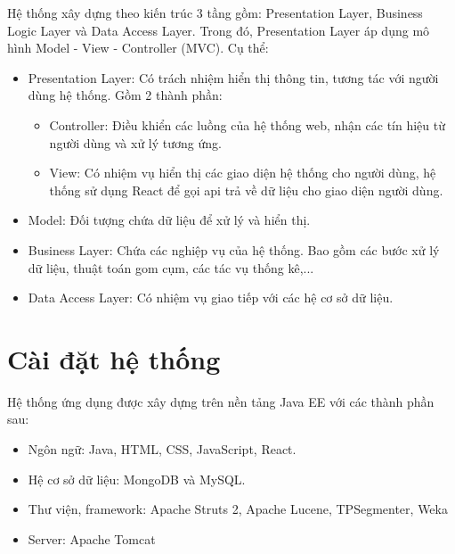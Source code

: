Hệ thống xây dựng theo kiến trúc 3 tầng gồm: Presentation Layer, Business Logic Layer và Data Access Layer. Trong đó, Presentation Layer áp dụng mô hình Model - View - Controller (MVC). Cụ thể:
	\begin{itemize}
		\item Presentation Layer: Có trách nhiệm hiển thị thông tin, tương tác với người dùng hệ thống. Gồm 2 thành phần:
			\begin{itemize}
				\item Controller: Điều khiển các luồng của hệ thống web, nhận các tín hiệu từ người dùng và xử lý tương ứng.
				\item View: Có nhiệm vụ hiển thị các giao diện hệ thống cho người dùng, hệ thống sử dụng React để gọi api trả về dữ liệu cho giao diện người dùng.
			\end{itemize}
		\item Model: Đối tượng chứa dữ liệu để xử lý và hiển thị.
		\item Business Layer: Chứa các nghiệp vụ của hệ thống. Bao gồm các bước xử lý dữ liệu, thuật toán gom cụm, các tác vụ thống kê,...
		\item Data Access Layer: Có nhiệm vụ giao tiếp với các hệ cơ sở dữ liệu.
	\end{itemize}

\section{Cài đặt hệ thống}%
Hệ thống ứng dụng được xây dựng trên nền tảng Java EE với các thành phần sau:
	\begin{itemize}
		\item Ngôn ngữ: Java, HTML, CSS, JavaScript, React.
		\item Hệ cơ sở dữ liệu: MongoDB và MySQL.
		\item Thư viện, framework: Apache Struts 2, Apache Lucene, TPSegmenter, Weka
		\item Server: Apache Tomcat
	\end{itemize}

